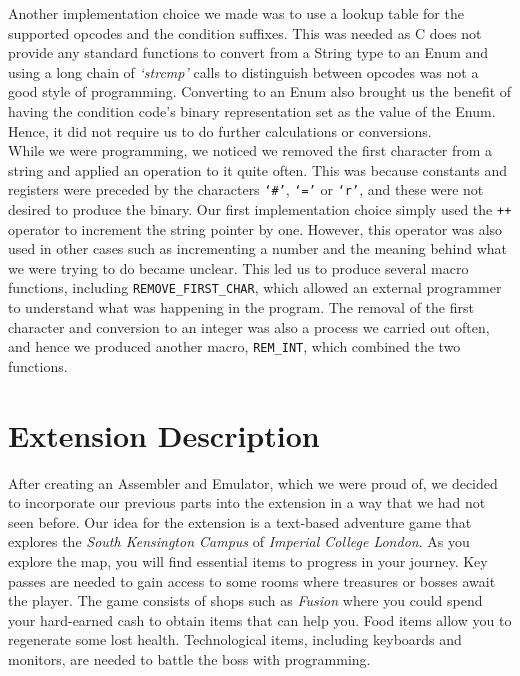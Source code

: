 \documentclass[10pt]{article}
\begin{document}
Another implementation choice we made was to use a lookup table for the supported opcodes and the condition suffixes. This was needed as C does not provide any standard functions to convert from a String type to an Enum and using a long chain of {\sl ‘strcmp’} calls to distinguish between opcodes was not a good style of programming. Converting to an Enum also brought us the benefit of having the condition code’s binary representation set as the value of the Enum. Hence, it did not require us to do further calculations or conversions.
\\

While we were programming, we noticed we removed the first character from a string and applied an operation to it quite often. This was because constants and registers were preceded by the characters {\tt ‘\#’}, {\tt ‘=’} or {\tt ‘r’}, and these were not desired to produce the binary. Our first implementation choice simply used the {\tt ++} operator to increment the string pointer by one. However, this operator was also used in other cases such as incrementing a number and the meaning behind what we were trying to do became unclear. This led us to produce several macro functions, including {\tt REMOVE\_FIRST\_CHAR}, which allowed an external programmer to understand what was happening in the program. The removal of the first character and conversion to an integer was also a process we carried out often, and hence we produced another macro, {\tt REM\_INT}, which combined the two functions. 

\section*{Extension Description}

After creating an Assembler and Emulator, which we were proud of, we decided to incorporate our previous parts into the extension in a way that we had not seen before. Our idea for the extension is a text-based adventure game that explores the {\sl South Kensington Campus} of {\sl Imperial College London}. As you explore the map, you will find essential items to progress in your journey. Key passes are needed to gain access to some rooms where treasures or bosses await the player. The game consists of shops such as {\sl Fusion} where you could spend your hard-earned cash to obtain items that can help you. Food items allow you to regenerate some lost health. Technological items, including keyboards and monitors, are needed to battle the boss with programming.
\\
\end{document}
